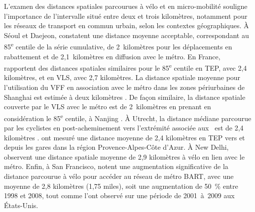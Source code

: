 \begin{refsegment}
L'examen des distances spatiales parcourues à vélo et en micro-mobilité souligne l'importance de l'intervalle situé entre deux et trois kilomètres, notamment pour les réseaux de transport en commun urbain, selon les contextes géographiques. À Séoul et Daejeon, \textcolor{blue}{\textcite[982]{lee_bicycle-based_2016}} constatent une distance moyenne acceptable, correspondant au 85\textsuperscript{e} centile de la série cumulative, de 2~kilomètres pour les déplacements en rabattement et de 2,1~kilomètres en diffusion avec le métro. En France, \textcolor{blue}{\textcite[62]{rabaud_quand_2022}} rapportent des distances spatiales similaires pour le 85\textsuperscript{e} centile en \acrshort{TEP}, avec 2,4 kilomètres, et en \acrshort{VLS}, avec 2,7 kilomètres. La distance spatiale moyenne pour l'utilisation du \acrshort{VFF} en association avec le métro dans les zones périurbaines de Shanghai est estimée à deux kilomètres \textcolor{blue}{\autocite[24]{lin_analysis_2019}}. De façon similaire, la distance spatiale couverte par le \acrshort{VLS} avec le métro est de 2~kilomètres en prenant en considération le 85\textsuperscript{e} centile, à Nanjing \textcolor{blue}{\autocite[64]{ma_understanding_2018}}. À Utrecht, la distance médiane parcourue par les cyclistes en post-acheminement vers l'extrémité associée aux ~est de 2,4 kilomètres \textcolor{blue}{\autocite[268]{krygsman_multimodal_2004}}. \textcolor{blue}{\textcite[22]{moinse_intermodal_2022}} ont mesuré une distance moyenne de 2,4 kilomètres en \acrshort{TEP} vers et depuis les gares dans la région Provence-Alpes-Côte d'Azur. À New Delhi, \textcolor{blue}{\textcite[16]{ann_examination_2019}} observent une distance spatiale moyenne de 2,9 kilomètres à vélo en lien avec le métro. Enfin, à San Francisco, \textcolor{blue}{\textcite[95]{cervero_bike-and-ride_2013}} notent une augmentation significative de la distance parcourue à vélo pour accéder au réseau de métro BART, avec une moyenne de 2,8 kilomètres (1,75 miles), soit une augmentation de 50~\% entre 1998 et 2008, tout comme l'ont observé \textcolor{blue}{\textcite[101]{wang_bicycle-transit_2013}} sur une période de 2001~à~2009 aux États-Unis.%


\end{refsegment}
